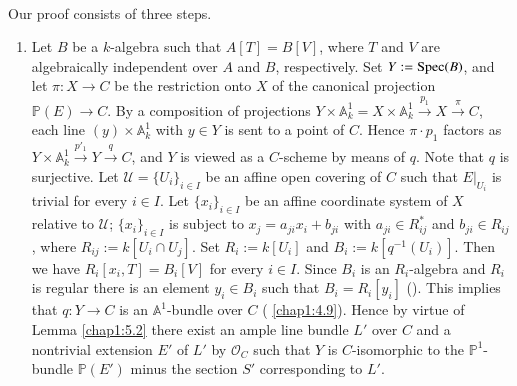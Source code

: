 \subsubsection{}\label{chap1:6.7.2}\pageoriginale\
\begin{proofofprop*}
Our proof consists of three steps.
\begin{enumerate}
\renewcommand{\theenumi}{\Roman{enumi}}
\renewcommand{\labelenumi}{(\theenumi)}
\item Let $B$ be a $k$-algebra such that $A[T]=B[V]$, where $T$ and
  $V$ are algebraically independent over $A$ and $B$,
  respectively. Set $Y:=\operatorname{Spec}(B)$, and let $\pi:X\to C$ be the
  restriction onto $X$ of the canonical projection $\mathbb{P}(E)\to
  C$. By a composition of projections $Y\times
  \mathbb{A}^{1}_{k}=X\times\mathbb{A}^{1}_{k}\xrightarrow{p_{1}}X\xrightarrow{\pi}C$,
  each line $(y)\times\mathbb{A}^{1}_{k}$ with $y\in Y$ is sent to a
  point of $C$. Hence $\pi\cdot p_{1}$ factors as
  $Y\times\mathbb{A}^{1}_{k}\xrightarrow{p'_{1}}Y\xrightarrow{q}C$,
  and $Y$ is viewed as a $C$-scheme by means of $q$. Note that $q$ is
  surjective. Let $\mathscr{U}=\{U_{i}\}_{i\in I}$ be an affine open
  covering of $C$ such that $E|_{U_{i}}$ is trivial for every $i\in
  I$. Let $\{x_{i}\}_{i\in I}$ be an affine coordinate system of $X$
  relative to $\mathscr{U}$; $\{x_{i}\}_{i\in I}$ is subject to
  $x_{j}=a_{ji}x_{i}+b_{ji}$ with $a_{ji}\in R^{\ast}_{ij}$ and
  $b_{ji}\in R_{ij}$, where $R_{ij}:=k[U_{i}\cap U_{j}]$. Set
  $R_{i}:=k[U_{i}]$ and $B_{i}:=k[q^{-1}(U_{i})]$. Then we have
  $R_{i}[x_{i},T]=B_{i}[V]$ for every $i\in I$. Since $B_{i}$ is an
  $R_{i}$-algebra and $R_{i}$ is regular there is an element $y_{i}\in
  B_{i}$ such that $B_{i}=R_{i}[y_{i}]$ (\cf [1; (4.7)]). This implies
  that $q:Y\to C$ is an $\mathbb{A}^{1}$-bundle over $C$ (\cf
  \ref{chap1:4.9}). Hence by virtue of Lemma \ref{chap1:5.2} there exist an
  ample line bundle $L'$ over $C$ and a nontrivial extension $E'$ of
  $L'$ by $\mathscr{O}_{C}$ such that $Y$ is $C$-isomorphic to the
  $\mathbb{P}^{1}$-bundle $\mathbb{P}(E')$ minus the section $S'$
  corresponding to $L'$.


\end{enumerate}
\end{proofofprop*}
